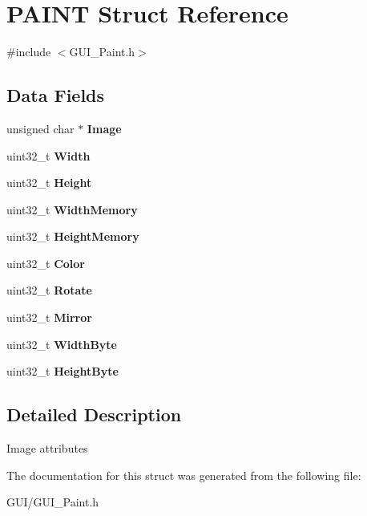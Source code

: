 \hypertarget{struct_p_a_i_n_t}{}\section{P\+A\+I\+NT Struct Reference}
\label{struct_p_a_i_n_t}


{\ttfamily \#include $<$G\+U\+I\+\_\+\+Paint.\+h$>$}

\subsection*{Data Fields}
\begin{DoxyCompactItemize}
\item 
\mbox{\label{struct_p_a_i_n_t_a944c22dd83968b2230d770f277d829fe}} 
unsigned char $\ast$ {\bfseries Image}
\item 
\mbox{\label{struct_p_a_i_n_t_ad672690f555bb08866a491753109e551}} 
uint32\+\_\+t {\bfseries Width}
\item 
\mbox{\label{struct_p_a_i_n_t_a3bdc883455d9732f65c9d4cb1aebe28b}} 
uint32\+\_\+t {\bfseries Height}
\item 
\mbox{\label{struct_p_a_i_n_t_aa33f6d1218ed41fc929f04564262bdfa}} 
uint32\+\_\+t {\bfseries Width\+Memory}
\item 
\mbox{\label{struct_p_a_i_n_t_a2a5221215f4b12db44cafd19878aa300}} 
uint32\+\_\+t {\bfseries Height\+Memory}
\item 
\mbox{\label{struct_p_a_i_n_t_a776e6d08288d1ca3f5a5c1c7faf0b56a}} 
uint32\+\_\+t {\bfseries Color}
\item 
\mbox{\label{struct_p_a_i_n_t_a9d9a968ef9c927bc871547ffbfa2105f}} 
uint32\+\_\+t {\bfseries Rotate}
\item 
\mbox{\label{struct_p_a_i_n_t_a4452911d49820d9ffac8d55d1bdadbbc}} 
uint32\+\_\+t {\bfseries Mirror}
\item 
\mbox{\label{struct_p_a_i_n_t_aa58ba4f4b2153058ed20cd50a10a26f0}} 
uint32\+\_\+t {\bfseries Width\+Byte}
\item 
\mbox{\label{struct_p_a_i_n_t_a7628704541f6c97f0e6c19ba7ea9bb81}} 
uint32\+\_\+t {\bfseries Height\+Byte}
\end{DoxyCompactItemize}


\subsection{Detailed Description}
Image attributes 

The documentation for this struct was generated from the following file\+:\begin{DoxyCompactItemize}
\item 
G\+U\+I/G\+U\+I\+\_\+\+Paint.\+h\end{DoxyCompactItemize}
